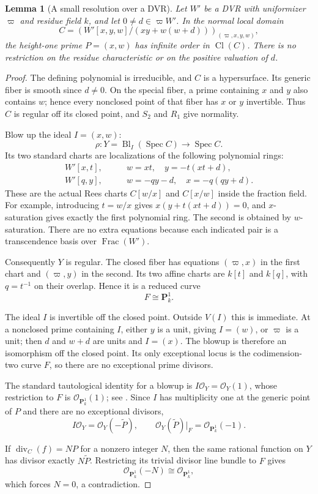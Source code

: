 \documentclass[11pt,a4paper]{article}
\newtheorem{lemma}[theorem]{Lemma}
\theoremstyle{remark}
\newcommand{\PP}{\mathbf P}
\newcommand{\OO}{\mathcal O}
\newcommand{\Spec}{\operatorname{Spec}}
\newcommand{\Cl}{\operatorname{Cl}}
\newcommand{\Frac}{\operatorname{Frac}}
\newcommand{\divisor}{\operatorname{div}}
\begin{document}
\begin{lemma}[A small resolution over a DVR]\label{lem:smallresolution}
Let $W'$ be a DVR with uniformizer $\varpi$ and residue field $k$, and let $0\neq d\in\varpi W'$. In the normal local domain
\[
C=\left(W'[x,y,w]/(xy+w(w+d))\right)_{(\varpi,x,y,w)},
\]
the height-one prime $P=(x,w)$ has infinite order in $\Cl(C)$. There is no restriction on the residue characteristic or on the positive valuation of $d$.
\end{lemma}
\begin{proof}
The defining polynomial is irreducible, and $C$ is a hypersurface. Its generic fiber is smooth since $d\neq0$. On the special fiber, a prime containing $x$ and $y$ also contains $w$; hence every nonclosed point of that fiber has $x$ or $y$ invertible. Thus $C$ is regular off its closed point, and $S_2$ and $R_1$ give normality.

Blow up the ideal $I=(x,w)$:
\[
\rho:Y=\operatorname{Bl}_{I}(\Spec C)\longrightarrow\Spec C.
\]
Its two standard charts are localizations of the following polynomial rings:
\begin{align*}
W'[x,t],&\qquad w=xt,\quad y=-t(xt+d),\\
W'[q,y],&\qquad w=-qy-d,\quad x=-q(qy+d).
\end{align*}
These are the actual Rees charts $C[w/x]$ and $C[x/w]$ inside the fraction field. For example, introducing $t=w/x$ gives $x(y+t(xt+d))=0$, and $x$-saturation gives exactly the first polynomial ring. The second is obtained by $w$-saturation. There are no extra equations because each indicated pair is a transcendence basis over $\Frac(W')$.

Consequently $Y$ is regular. The closed fiber has equations $(\varpi,x)$ in the first chart and $(\varpi,y)$ in the second. Its two affine charts are $k[t]$ and $k[q]$, with $q=t^{-1}$ on their overlap. Hence it is a reduced curve
\[
F\cong\PP^1_k.
\]

The ideal $I$ is invertible off the closed point. Outside $V(I)$ this is immediate. At a nonclosed prime containing $I$, either $y$ is a unit, giving $I=(w)$, or $\varpi$ is a unit; then $d$ and $w+d$ are units and $I=(x)$. The blowup is therefore an isomorphism off the closed point. Its only exceptional locus is the codimension-two curve $F$, so there are no exceptional prime divisors.

The standard tautological identity for a blowup is $I\OO_Y=\OO_Y(1)$, whose restriction to $F$ is $\OO_{\PP^1_k}(1)$; see \cite{StacksBlowup}. Since $I$ has multiplicity one at the generic point of $P$ and there are no exceptional divisors,
\[
I\OO_Y=\OO_Y(-\widetilde P),\qquad
\OO_Y(\widetilde P)|_F=\OO_{\PP^1_k}(-1).
\]

If $\divisor_C(f)=NP$ for a nonzero integer $N$, then the same rational function on $Y$ has divisor exactly $N\widetilde P$. Restricting its trivial divisor line bundle to $F$ gives
\[
\OO_{\PP^1_k}(-N)\cong\OO_{\PP^1_k},
\]
which forces $N=0$, a contradiction.
\end{proof}
\end{document}
